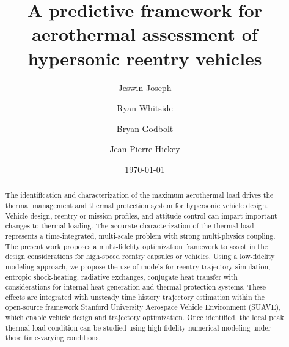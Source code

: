 \documentclass[%
 aip,
 amsmath,amssymb,
preprint,%
]{revtex4-1}
\begin{document}

\title[Aerothermal assessment of reentry vehicles]{A predictive framework for aerothermal assessment of hypersonic reentry vehicles}
\author{Jeswin Joseph}

%


\author{Ryan Whitside}

\author{Bryan Godbolt}

%

\author{Jean-Pierre Hickey}

%

\date{\today}%



\begin{abstract}
The identification and characterization of the maximum aerothermal load drives the thermal management and thermal protection system for hypersonic vehicle design.  Vehicle design, reentry or mission profiles, and attitude control can impart important changes to thermal loading. The accurate characterization of the thermal load represents a time-integrated, multi-scale problem with strong multi-physics coupling.  The present work proposes a multi-fidelity optimization framework to assist in the design considerations for high-speed reentry capsules or vehicles. Using a low-fidelity modeling approach, we propose the use of models for reentry trajectory simulation, entropic shock-heating, radiative exchanges, conjugate heat transfer with considerations for internal heat generation and thermal protection systems. These effects are integrated with unsteady time history trajectory estimation within the open-source framework Stanford University Aerospace Vehicle Environment (SUAVE), which enable vehicle design and trajectory optimization. Once identified, the local peak thermal load condition can be studied using high-fidelity numerical modeling under these time-varying conditions.
\end{abstract}
\end{document}
